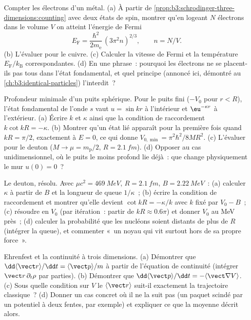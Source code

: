\begin{exercise}[$\star\star$]\label{exo:b3:schrodinger-three-dimensions:8}
Compter les électrons d'un métal. (a) À partir de
\cref{prop:b3:schrodinger-three-dimensions:counting} avec deux états de
spin, montrer qu'en logeant $N$ électrons dans le volume $V$ on atteint
l'énergie de Fermi
\[
E_{\text{F}} = \frac{\hbar^2}{2m_{\text{e}}}\,(3\pi^2n)^{2/3} ,
\qquad n = N/V .
\]
(b) L'évaluer pour le cuivre. (c) Calculer la vitesse de Fermi et la
température $E_{\text{F}}/k_{\text{B}}$ correspondantes. (d) En une
phrase~: pourquoi les électrons ne se placent-ils pas tous dans l'état
fondamental, et quel principe (annoncé ici, démontré au
\cref{ch:b3:identical-particles}) l'interdit~?
\end{exercise}

\begin{exercise}[$\star\star$]\label{exo:b3:schrodinger-three-dimensions:9}
Profondeur minimale d'un puits sphérique. Pour le puits fini ($-V_0$
pour $r < R$), l'état fondamental de l'onde $s$ vaut $u = \sin kr$ à
l'intérieur et $\eu^{-\kappa r}$ à l'extérieur. (a) Écrire $k$ et
$\kappa$ ainsi que la condition de raccordement $k\cot kR = -\kappa$.
(b) Montrer qu'un état lié apparaît pour la première fois quand
$kR = \pi/2$, exactement à $E = 0$, ce qui donne
$V_{0,\min} = \pi^2\hbar^2/8MR^2$. (c) L'évaluer pour le deuton
($M \to \mu = m_{\text{p}}/2$, $R = \qty{2.1}{fm}$). (d) Opposer au cas
unidimensionnel, où le puits le moins profond lie déjà~: que change
physiquement le mur $u(0) = 0$~?
\end{exercise}

\begin{exercise}[$\star\star\star$]\label{exo:b3:schrodinger-three-dimensions:10}
Le deuton, résolu. Avec $\mu c^2 = \qty{469}{MeV}$, $R =
\qty{2.1}{fm}$, $B = \qty{2.22}{MeV}$~: (a) calculer $\kappa$ à partir
de $B$ et la longueur de queue $1/\kappa$~; (b) écrire la condition de
raccordement et montrer qu'elle devient $\cot kR = -\kappa/k$ avec $k$
fixé par $V_0 - B$~; (c) résoudre en $V_0$ (par itération~: partir de
$kR \approx 0.6\pi$) et donner $V_0$ au MeV près~; (d) calculer la
probabilité que les nucléons soient distants de plus de $R$ (intégrer
la queue), et commenter «~un noyau qui vit surtout hors de sa propre
force~».
\end{exercise}

\begin{exercise}[$\star\star\star$]\label{exo:b3:schrodinger-three-dimensions:11}
Ehrenfest et la continuité à trois dimensions. (a) Démontrer que
$\dd\langle\vect r\rangle/\dd t = \langle\vect p\rangle/m$ à partir de
l'équation de continuité (intégrer $\vect r\,\partial_t\rho$ par
parties). (b) Démontrer que $\dd\langle\vect p\rangle/\dd t =
-\langle\vect\nabla V\rangle$. (c) Sous quelle condition sur $V$ le
$\langle\vect r\rangle$ suit-il exactement la trajectoire classique~?
(d) Donner un cas concret où il ne la suit pas (un paquet scindé par un
potentiel à deux fentes, par exemple) et expliquer ce que la moyenne
décrit alors.
\end{exercise}

